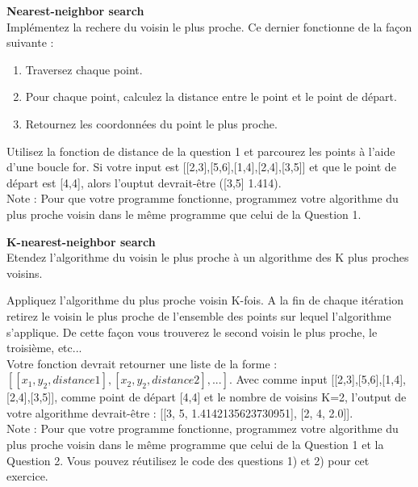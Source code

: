 \begin{Exercice}[10 minutes]\textbf{Nearest-neighbor search}\\

Implémentez la rechere du voisin le plus proche. Ce dernier fonctionne de la façon suivante :
\begin{enumerate}
    \item Traversez chaque point.
    \item Pour chaque point, calculez la distance entre le point et le point de départ.
    \item Retournez les coordonnées du point le plus proche.
\end{enumerate}
    
\begin{conseil}
    Utilisez la fonction de distance de la question 1 et parcourez les points à l'aide d'une boucle for. Si votre input est [[2,3],[5,6],[1,4],[2,4],[3,5]] et que le point de départ est [4,4], alors l'ouptut devrait-être ([3,5] 1.414).\\
    
    Note : Pour que votre programme fonctionne, programmez votre algorithme du plus proche voisin dans le même programme que celui de la Question 1.
\end{conseil}
\begin{solution}
    
\end{solution}
\end{Exercice}


\begin{Exercice}[15 minutes]\textbf{K-nearest-neighbor search}\\


Etendez l'algorithme du voisin le plus proche à un algorithme des K plus proches voisins.\\

\begin{conseil}
Appliquez l'algorithme du plus proche voisin K-fois. A la fin de chaque itération retirez le voisin le plus proche de l'ensemble des points sur lequel l'algorithme s'applique. De cette façon vous trouverez le second voisin le plus proche, le troisième, etc...\\

Votre fonction devrait retourner une liste de la forme : $[[x_1,y_2, distance1],[x_2,y_2,distance2],...]$. Avec comme input [[2,3],[5,6],[1,4],[2,4],[3,5]], comme point de départ [4,4] et le nombre de voisins K=2, l'output de votre algorithme devrait-être : [[3, 5, 1.4142135623730951], [2, 4, 2.0]].\\

Note : Pour que votre programme fonctionne, programmez votre algorithme du plus proche voisin dans le même programme que celui de la Question 1 et la Question 2. Vous pouvez réutilisez le code des questions 1) et 2) pour cet exercice.
\end{conseil}

\begin{solution}
    
\end{solution}
\end{Exercice}
\newpage
